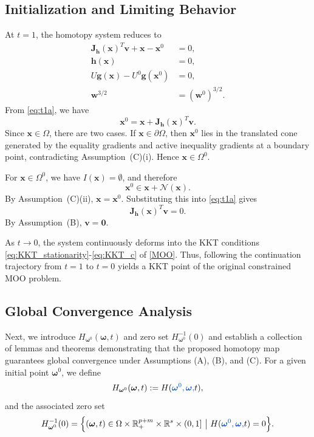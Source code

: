 \documentclass[11pt,pdflatex,sn-mathphys-ay]{sn-jnl}%
\theoremstyle{definition}
\theoremstyle{thmstyleone}%
\theoremstyle{thmstyletwo}%
\theoremstyle{thmstylethree}%
\newcommand{\bb}[1]{\mathbf{#1}}
\newcounter{cases}
\newcommand{\add}[1]{\textcolor{revisionblue}{#1}}
\begin{document}
	\subsection{Initialization and Limiting Behavior}
	At \(t=1\), the homotopy system reduces to
	\begin{subequations}
		\label{eq:t1_system}
		\begin{align}
			\mathbf{J}_{\bm h}(\bm{x})^T \bm{v} + \bm{x}-\bm{x}^0 &= 0, \label{eq:t1a}\\
			\bm{h}(\bm{x}) &= 0, \label{eq:t1b}\\
			U\bm g(\bm{x}) - U^{0}\bm g(\bm{x}^{0}) &= 0, \label{eq:t1c}\\
			\bb{w}^{3/2} &= (\bb{w}^{0})^{3/2}. \label{eq:t1d}
		\end{align}
	\end{subequations}
	From \eqref{eq:t1a}, we have
	\[
	\bm{x}^0=\bm{x}+\mathbf J_{\bm h}(\bm{x})^T\bm v.
	\]
	Since $\bm{x}\in\Omega$, there are two cases. If $\bm{x}\in\partial\Omega$, then $\bm{x}^0$ lies in the translated cone generated by the equality gradients and active inequality gradients at a boundary point, contradicting Assumption~(C)(i). Hence $\bm{x}\in\Omega^0$.
	
	For $\bm{x}\in\Omega^0$, we have $I(\bm{x})=\emptyset$, and therefore
	\[
	\bm{x}^0\in \bm{x}+\mathcal N(\bm{x}).
	\]
	By Assumption~(C)(ii), $\bm{x}=\bm{x}^0$. Substituting this into \eqref{eq:t1a} gives
	\[
	\mathbf J_{\bm h}(\bm{x})^T\bm v=0.
	\]
	By Assumption~(B), $\bm v=\bm 0$.
	
	As $t \to 0$, the system continuously deforms into the KKT conditions\,\eqref{eq:KKT_stationarity}-\eqref{eq:KKT_c} of \eqref{MOO}. 
	Thus, following the continuation trajectory from \(t=1\) to \(t=0\) yields a KKT point of the original constrained MOO problem.
	
	\subsection{Global Convergence Analysis}
	Next, we introduce $H_{\bm{\omega}^{0}}(\bm{\omega}, t)$ and zero set $H_{\bm{\omega}^{0}}^{-1}(0)$ and establish a collection of lemmas and theorems demonstrating that the proposed homotopy map guarantees global convergence under Assumptions (A), (B), and (C). For a given initial point \(\bm{\omega}^{0}\), we define
	\[
	H_{\bm{\omega}^{0}}(\bm{\omega}, t) := H(\add{\bm{\omega}^{0}, \bm{\omega},} t),
	\]
	and the associated zero set
	\[
	H_{\bm{\omega}^{0}}^{-1}(0) 
	= 
	\Big\{ 
	(\bm{\omega}, t) \in 
	\Omega \times \mathbb{R}_{+}^{p+m} \times \mathbb{R}^s \times (0,1] 
	~\big|~ 
	H(\add{\bm{\omega}^{0}, \bm{\omega},} t) = 0 
	\Big\}.
	\]
	
\end{document}
